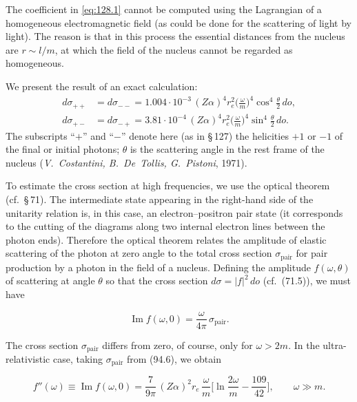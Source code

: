 
The coefficient in \eqref{eq:128.1} cannot be computed using the Lagrangian of a homogeneous electromagnetic field (as could be done for the scattering of light by light). The reason is that in this process the essential distances from the nucleus are $r \sim l/m$, at which the field of the nucleus cannot be regarded as homogeneous.

We present the result of an exact calculation:
\begin{equation}
\begin{aligned}
d\sigma_{++} &= d\sigma_{--} = 1.004 \cdot 10^{-3}\,(Z\alpha)^4 r_e^2 \biggl(\frac{\omega}{m}\biggr)^{\!4} \cos^4\frac{\theta}{2}\, do, \\[6pt]
d\sigma_{+-} &= d\sigma_{-+} = 3.81 \cdot 10^{-4}\,(Z\alpha)^4 r_e^2 \biggl(\frac{\omega}{m}\biggr)^{\!4} \sin^4\frac{\theta}{2}\, do.
\end{aligned}
\label{eq:128.2}
\end{equation}
The subscripts ``$+$'' and ``$-$'' denote here (as in \S\,127) the helicities $+1$ or $-1$ of the final or initial photons; $\theta$ is the scattering angle in the rest frame of the nucleus (\emph{V.~Costantini, B.~De~Tollis, G.~Pistoni}, 1971).

To estimate the cross section at high frequencies, we use the optical theorem (cf.\ \S\,71). The intermediate state appearing in the right-hand side of the unitarity relation is, in this case, an electron--positron pair state (it corresponds to the cutting of the diagrams along two internal electron lines between the photon ends). Therefore the optical theorem relates the amplitude of elastic scattering of the photon at zero angle to the total cross section $\sigma_\text{pair}$ for pair production by a photon in the field of a nucleus. Defining the amplitude $f(\omega,\theta)$ of scattering at angle $\theta$ so that the cross section $d\sigma = |f|^2\,do$ (cf.\ (71.5)), we must have

\[
\operatorname{Im} f(\omega, 0) = \frac{\omega}{4\pi}\,\sigma_\text{pair}.
\]

The cross section $\sigma_\text{pair}$ differs from zero, of course, only for $\omega > 2m$. In the ultra-relativistic case, taking $\sigma_\text{pair}$ from (94.6), we obtain

\begin{equation}
f''(\omega) \equiv \operatorname{Im} f(\omega, 0) = \frac{7}{9\pi}\,(Z\alpha)^2 r_e \,\frac{\omega}{m} \biggl[\ln\frac{2\omega}{m} - \frac{109}{42}\biggr], \qquad \omega \gg m.
\label{eq:128.3}
\end{equation}

